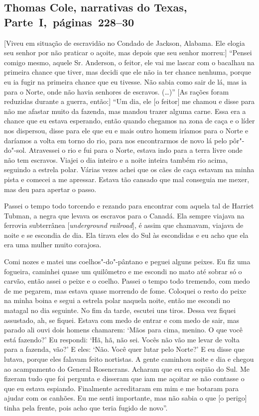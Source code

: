 \subsection{Thomas Cole, narrativas do Texas, Parte~I,~páginas~228--30} \label{ref57}

{[}Viveu em situação de escravidão no Condado de Jackson, Alabama. Ele elogia seu senhor por não praticar o açoite, mas depois que seu
senhor morreu:{]} ``Pensei comigo mesmo, aquele Sr. Anderson, o feitor,
ele vai me lascar com o bacalhau na primeira chance que tiver, mas
decidi que ele não ia ter chance nenhuma, porque eu ia fugir na primeira
chance que eu tivesse. Não sabia como sair de lá, mas ia para o Norte,
onde não havia senhores de escravos. (\ldots{})'' {[}As rações foram
reduzidas durante a guerra, então:{]} ``Um dia, ele {[}o feitor{]} me
chamou e disse para não me afastar muito da fazenda, mas mandou trazer
alguma carne. Essa era a chance que eu estava esperando, então quando
chegamos na zona de caça e o líder nos dispersou, disse para ele que eu
e mais outro homem iríamos para o Norte e daríamos a volta em torno do
rio, para nos encontrarmos de novo lá pelo pôr"-do"-sol. Atravessei o rio
e fui para o Norte, estava indo para a terra livre onde não tem
escravos. Viajei o dia inteiro e a noite inteira também rio acima,
seguindo a estrela polar. Várias vezes achei que os cães de caça estavam na
minha pista e comecei a me apressar. Estava tão cansado que mal
conseguia me mexer, mas deu para apertar o passo.

Passei o tempo todo torcendo e rezando para encontrar com aquela tal de
Harriet Tubman, a negra que levava os escravos para o Canadá. Ela sempre
viajava na ferrovia subterrânea {[}\emph{underground railroad}{]}, é assim que
chamavam, viajava de noite e se escondia de dia. Ela tirava eles do Sul
às escondidas e eu acho que ela era uma mulher muito corajosa.

Comi nozes e matei uns coelhos"-do"-pântano e peguei alguns peixes. Eu fiz
uma fogueira, caminhei quase um quilômetro e me escondi no mato até
sobrar só o carvão, então assei o peixe e o coelho. Passei o tempo todo
tremendo, com medo de me pegarem, mas estava quase morrendo de fome.
Coloquei o resto do peixe na minha boina e segui a estrela polar naquela
noite, então me escondi no matagal no dia seguinte. No fim da tarde,
escutei uns tiros. Dessa vez fiquei assustado, ah, se fiquei. Estava com
medo de entrar e com medo de sair, mas parado ali ouvi dois homens
chamarem: `Mãos para cima, menino. O que você está fazendo?' Eu
respondi: `Hã, hã, não sei. Vocês não vão me levar de volta para a fazenda,
vão?' E eles: `Não. Você quer lutar pelo Norte?' E eu disse que lutava,
porque eles falavam feito nortistas. A gente caminhou noite e dia e
chegou ao acampamento do General Rosencrans. Acharam que eu era espião
do Sul. Me fizeram tudo que foi pergunta e disseram que iam me açoitar
se não contasse o que eu estava espiando. Finalmente acreditaram em mim
e me botaram para ajudar com os canhões. Eu me senti importante, mas não
sabia o que {[}o perigo{]} tinha pela frente, pois acho que teria fugido
de novo''.

